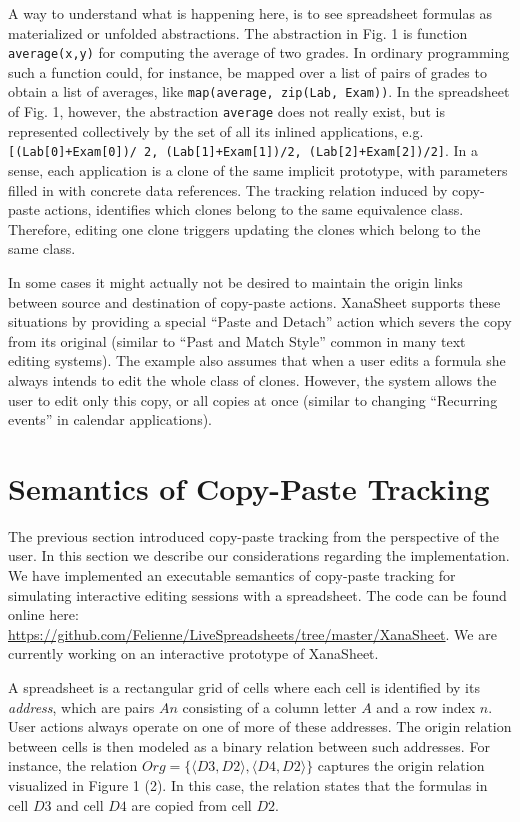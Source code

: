 \documentclass[11pt,]{article}
\begin{document}
A way to understand what is happening here, is to see spreadsheet
formulas as materialized or unfolded abstractions. The abstraction in
Fig. 1 is function \texttt{average(x,y)} for computing the average of
two grades. In ordinary programming such a function could, for instance,
be mapped over a list of pairs of grades to obtain a list of averages,
like \texttt{map(average,\ zip(Lab,\ Exam))}. In the spreadsheet of Fig.
1, however, the abstraction \texttt{average} does not really exist, but
is represented collectively by the set of all its inlined applications,
e.g.
\texttt{{[}(Lab{[}0{]}+Exam{[}0{]})/\ 2,\ (Lab{[}1{]}+Exam{[}1{]})/2,\ (Lab{[}2{]}+Exam{[}2{]})/2{]}}.
In a sense, each application is a clone of the same implicit prototype,
with parameters filled in with concrete data references. The tracking
relation induced by copy-paste actions, identifies which clones belong
to the same equivalence class. Therefore, editing one clone triggers
updating the clones which belong to the same class.

In some cases it might actually not be desired to maintain the origin
links between source and destination of copy-paste actions. XanaSheet
supports these situations by providing a special ``Paste and Detach''
action which severs the copy from its original (similar to ``Past and
Match Style'' common in many text editing systems). The example also
assumes that when a user edits a formula she always intends to edit the
whole class of clones. However, the system allows the user to edit only
this copy, or all copies at once (similar to changing ``Recurring
events'' in calendar applications).

\section{Semantics of Copy-Paste
Tracking}\label{semantics-of-copy-paste-tracking}

The previous section introduced copy-paste tracking from the perspective
of the user. In this section we describe our considerations regarding
the implementation. We have implemented an executable semantics of
copy-paste tracking for simulating interactive editing sessions with a
spreadsheet. The code can be found online here:
\url{https://github.com/Felienne/LiveSpreadsheets/tree/master/XanaSheet}.
We are currently working on an interactive prototype of XanaSheet.

A spreadsheet is a rectangular grid of cells where each cell is
identified by its \emph{address}, which are pairs \(An\) consisting of a
column letter \(A\) and a row index \(n\). User actions always operate
on one of more of these addresses. The origin relation between cells is
then modeled as a binary relation between such addresses. For instance,
the relation \(Org = \{\langle D3, D2\rangle,\langle D4, D2\rangle\}\)
captures the origin relation visualized in Figure 1 (2). In this case,
the relation states that the formulas in cell \(D3\) and cell \(D4\) are
copied from cell \(D2\).
\end{document}
